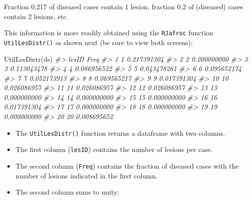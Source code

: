 \documentclass[
]{book}
\newenvironment{Shaded}{\begin{snugshade}}{\end{snugshade}}
\newcommand{\CommentTok}[1]{\textcolor[rgb]{0.56,0.35,0.01}{\textit{#1}}}
\newcommand{\FunctionTok}[1]{\textcolor[rgb]{0.00,0.00,0.00}{#1}}
\newcommand{\NormalTok}[1]{#1}
\newcommand{\SpecialCharTok}[1]{\textcolor[rgb]{0.00,0.00,0.00}{#1}}
\providecommand{\tightlist}{%
  \setlength{\itemsep}{0pt}\setlength{\parskip}{0pt}}
\begin{document}
Fraction 0.217 of diseased cases contain 1 lesion, fraction 0.2 of (diseased) cases contain 2 lesions, etc.

This information is more readily obtained using the \texttt{RJafroc} function \texttt{UtilLesDistr()} as shown next (be sure to view both screens):

\begin{Shaded}
\begin{Highlighting}[]
\FunctionTok{UtilLesDistr}\NormalTok{(ds)}
\CommentTok{\#\textgreater{}    lesID        Freq}
\CommentTok{\#\textgreater{} 1      1 0.217391304}
\CommentTok{\#\textgreater{} 2      2 0.200000000}
\CommentTok{\#\textgreater{} 3      3 0.113043478}
\CommentTok{\#\textgreater{} 4      4 0.086956522}
\CommentTok{\#\textgreater{} 5      5 0.043478261}
\CommentTok{\#\textgreater{} 6      6 0.095652174}
\CommentTok{\#\textgreater{} 7      7 0.052173913}
\CommentTok{\#\textgreater{} 8      8 0.069565217}
\CommentTok{\#\textgreater{} 9      9 0.017391304}
\CommentTok{\#\textgreater{} 10    10 0.026086957}
\CommentTok{\#\textgreater{} 11    11 0.026086957}
\CommentTok{\#\textgreater{} 12    12 0.026086957}
\CommentTok{\#\textgreater{} 13    13 0.000000000}
\CommentTok{\#\textgreater{} 14    14 0.000000000}
\CommentTok{\#\textgreater{} 15    15 0.000000000}
\CommentTok{\#\textgreater{} 16    16 0.017391304}
\CommentTok{\#\textgreater{} 17    17 0.000000000}
\CommentTok{\#\textgreater{} 18    18 0.000000000}
\CommentTok{\#\textgreater{} 19    19 0.000000000}
\CommentTok{\#\textgreater{} 20    20 0.008695652}
\end{Highlighting}
\end{Shaded}

\begin{itemize}
\tightlist
\item
  The \texttt{UtilLesDistr()} function returns a dataframe with two columns.
\item
  The first column (\texttt{lesID}) contains the number of lesions per case.
\item
  The second column (\texttt{Freq}) contains the fraction of diseased cases with the number of lesions indicated in the first column.
\item
  The second column sums to unity:
\end{itemize}

\begin{Shaded}
\end{Shaded}
\end{document}
